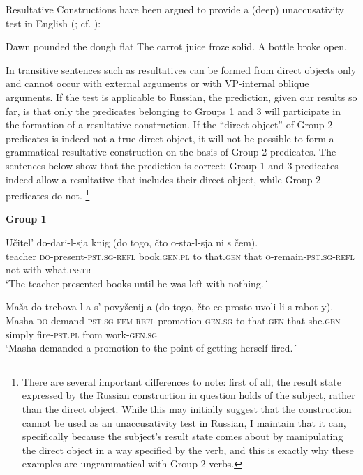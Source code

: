 \documentclass[output=paper,colorlinks,citecolor=brown,modfonts,nonflat]{langsci/langscibook}
\begin{document}
Resultative Constructions have been argued to provide a (deep) unaccusativity test in English (\citealt{LevinRappaportHovav1995}; cf. \citealt{RappaportHovavLevin2001, Kratzer2005}):


\ea%
    \label{ex:antonyuk:28}
    \ea \label{ex:antonyuk:28a}
    Dawn pounded the dough flat \hfill \citep{Irvin2012}
    \ex \label{ex:antonyuk:28b}
    The carrot juice froze solid.
    \ex \label{ex:antonyuk:28c}
    A bottle broke open.
    \z
\z

In transitive sentences such as  resultatives can be formed from direct objects only and cannot occur with external arguments or with VP-internal oblique arguments. If the test is applicable to Russian, the prediction, given our results so far, is that only the predicates belonging to Groups 1 and 3 will participate in the formation of a resultative construction. If the “direct object” of Group 2 predicates is indeed not a true direct object, it will not be possible to form a grammatical resultative construction on the basis of Group 2 predicates. The sentences below show that the prediction is correct: Group 1 and 3 predicates indeed allow a resultative that includes their direct object, while Group 2 predicates do not. \footnote{There are several important differences to note: first of all, the result state expressed by the Russian construction in question holds of the subject, rather than the direct object. While this may initially suggest that the construction cannot be used as an unaccusativity test in Russian, I maintain that it can, specifically because the subject’s result state comes about by manipulating the direct object in a way specified by the verb, and this is exactly why these examples are ungrammatical with Group 2 verbs.}

\textbf{Group 1}

\ea%
    \label{ex:antonyuk:29}
    \gll    Učitel’ do-dari-l-sja knig (do togo, čto o-sta-l-sja ni s čem).\\
            teacher \textsc{do-}present\textsc{-pst.sg-refl} book\textsc{.gen.pl} to that\textsc{.gen} that \textsc{o-}remain\textsc{-pst.sg-refl} not with what\textsc{.instr}\\
    \glt    `The teacher presented books until he was left with nothing.´
    \z

\ea%
    \label{ex:antonyuk:30}
    \gll    Maša do-trebova-l-a-s’ povyšenij-a (do togo, čto ee prosto uvoli-li s rabot-y).\\
            Masha \textsc{do-}demand\textsc{-pst.sg-fem-refl} promotion\textsc{-gen.sg} to that\textsc{.gen} that she\textsc{.gen} simply fire\textsc{-pst.pl} from work\textsc{-gen.sg}\\
    \glt    `Masha demanded a promotion to the point of getting herself fired.´
    \z
\end{document}
